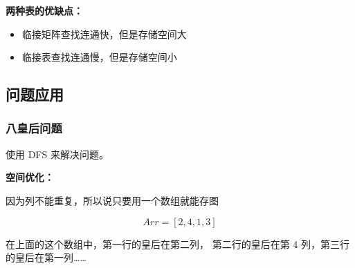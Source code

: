 \documentclass[UTF8]{ctexart}
\begin{document}
\noindent
\textbf{两种表的优缺点：}
\begin{itemize}
    \item 临接矩阵查找连通快，但是存储空间大
    \item 临接表查找连通慢，但是存储空间小
\end{itemize}

\subsection{问题应用}

\subsubsection{八皇后问题}

\noindent
使用 DFS 来解决问题。

\vskip 0.2cm
\noindent
\textbf{空间优化：}

因为列不能重复，所以说只要用一个数组就能存图

\[Arr = [2, 4, 1, 3]\]

在上面的这个数组中，第一行的皇后在第二列，
第二行的皇后在第 4 列，第三行的皇后在第一列……
\end{document}
